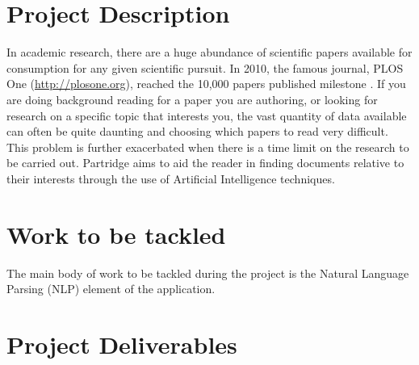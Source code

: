 \documentclass[12pt,a4paper]{article}
\begin{document}



\setlength{\parindent}{0pt}
\setlength{\parskip}{1.5ex plus 0.5ex minus 0.2ex}


\pagebreak

\section{Project Description}

In academic research, there are a huge abundance of scientific papers available for
consumption for any given scientific pursuit. In 2010, the famous journal,
PLOS One (\url{http://plosone.org}), reached the 10,000 papers published milestone \cite{PlosOne2010}. If you 
are doing background reading for a paper you are authoring, or looking for 
research on a specific topic that interests you, the vast quantity of data available can often be
quite daunting and choosing which papers to read very difficult. This problem
is further exacerbated when there is a time limit on the research to be carried
out. Partridge aims to aid the reader in finding documents relative to their
interests through the use of Artificial Intelligence techniques.



\section{Work to be tackled}

The main body of work to be tackled during the project is the Natural Language
Parsing (NLP) element of the application. 



\section{Project Deliverables}

\pagebreak



\nocite{*}

\end{document}
